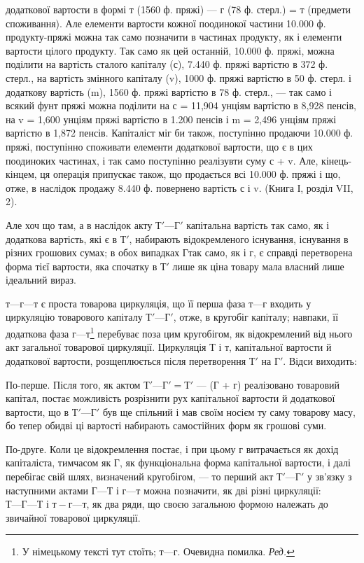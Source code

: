 \parcont{}  %
додаткової вартости в формі т (1560 ф. пряжі) — г (78 ф. стерл.) = т
(предмети споживання). Але елементи вартости кожної поодинокої частини
10.000  ф. продукту-пряжі можна так само позначити в частинах продукту,
як і елементи вартости цілого продукту. Так само як цей останній, 10.000 ф. пряжі, можна поділити на
вартість сталого капіталу (с), 7.440 ф.
пряжі вартістю в 372 ф. стерл., на вартість змінного капіталу (v), 1000 ф.
пряжі вартістю в 50 ф. стерл. і додаткову вартість (m), 1560 ф. пряжі
вартістю в 78 ф. стерл., — так само і всякий фунт пряжі можна поділити
на с = 11,904 унціям вартістю в 8,928 пенсів, на v = 1,600 унціям пряжі
вартістю в 1.200 пенсів і m = 2,496 унціям пряжі вартістю в 1,872 пенсів.
Капіталіст міг би також, поступінно продаючи 10.000 ф. пряжі, поступінно
споживати елементи додаткової вартости, що є в цих поодиноких частинах,
і так само поступінно реалізувти суму с + v. Але, кінець-кінцем, ця операція
припускає також, що продається всі 10.000 ф. пряжі і що, отже, в наслідок
продажу 8.440 ф. повернено вартість с і v. (Книга І, розділ VII, 2).

Але хоч що там, а в наслідок акту $Т' — Г'$ капітальна вартість так
само, як і додаткова вартість, які є в $Т'$, набирають відокремленого
існування, існування в різних грошових сумах; в обох випадках $Г т$ак
само, як і г, є справді перетворена форма тієї вартости, яка спочатку
в $Т'$ лише як ціна товару мала власний лише ідеальний вираз.

$т — г — т$ є проста товарова циркуляція, що її перша фаза $т — г$ входить
у циркуляцію товарового капіталу $Т' — Г'$, отже, в кругобіг капіталу;
навпаки, її додаткова фаза $г — т$\footnote*{
У німецькому тексті тут стоїть; $т — г$. Очевидна помилка. \emph{Ред.}
} перебуває поза цим кругобігом, як
відокремлений від нього акт загальної товарової циркуляції. Циркуляція
Т і т, капітальної вартости й додаткової вартости, розщеплюється після
перетворення $Т'$ на $Г'$. Відси виходить:

По-перше. Після того, як актом $Т' — Г' = Т'$ — (Г + г) реалізовано
товаровий капітал, постає можливість розрізнити рух капітальної
вартости й додаткової вартости, що в $Т' — Г'$ був ще спільний і мав своїм
носієм ту саму товарову масу, бо тепер обидві ці вартості набирають
самостійних форм як грошові суми.

По-друге. Коли це відокремлення постає, і при цьому г витрачається
як дохід капіталіста, тимчасом як Г, як функціональна форма капітальної
вартости, і далі перебігає свій шлях, визначений кругобігом, — то перший
акт $Т' — Г'$ у зв’язку з наступними актами $Г — Т$ і $г — т$ можна позначити,
як дві різні циркуляції: $Т — Г — Т$ і $т-г — т$, як два ряди, що своєю
загальною формою належать до звичайної товарової циркуляції.

